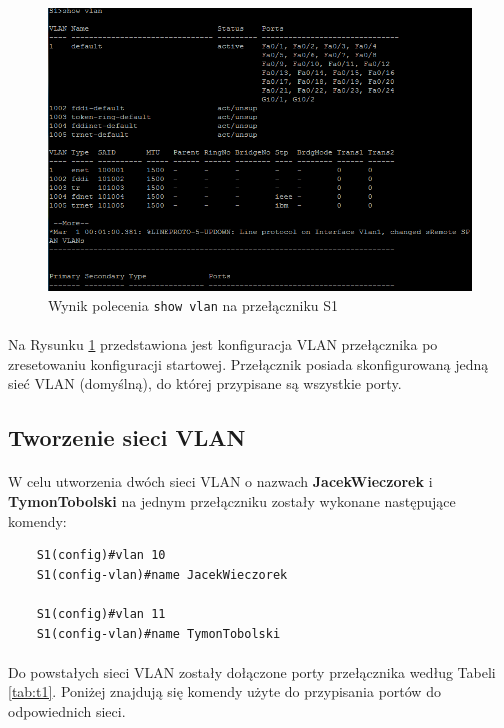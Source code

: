 \documentclass[wide,a4paper,titlepage,12pt] {article}
\begin{document}
  \begin{figure}[htbp]
    \begin{center}
      \includegraphics[width=\textwidth]{img/t4.PNG}
      \caption{Wynik polecenia \texttt{show vlan} na przełączniku S1}
      \label{fig:t4}
    \end{center}
  \end{figure}

  \paragraph{}
  Na Rysunku \ref{fig:t4} przedstawiona jest konfiguracja VLAN przełącznika po zresetowaniu konfiguracji startowej. Przełącznik posiada skonfigurowaną jedną sieć VLAN (domyślną), do której przypisane są wszystkie porty.


  \subsection{Tworzenie sieci VLAN}
  \paragraph{}
  W celu utworzenia dwóch sieci VLAN o nazwach \textbf{JacekWieczorek} i \textbf{TymonTobolski} na jednym przełączniku zostały wykonane następujące komendy:
  \begin{verbatim}
    S1(config)#vlan 10
    S1(config-vlan)#name JacekWieczorek

    S1(config)#vlan 11
    S1(config-vlan)#name TymonTobolski
  \end{verbatim}

  \paragraph{}
  Do powstałych sieci VLAN zostały dołączone porty przełącznika według Tabeli \ref{tab:t1}.
  Poniżej znajdują się komendy użyte do przypisania portów do odpowiednich sieci.
\end{document}
